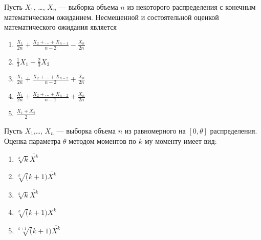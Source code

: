 \documentclass[t]{beamer}
\begin{document}
 \begin{frame} \label{33} 
\begin{block}{33} 

Пусть $X_1$, \ldots, $X_n$ — выборка объема $n$ из некоторого распределения с конечным математическим ожиданием. Несмещенной и состоятельной оценкой математического ожидания является
 


 \end{block} 
\begin{enumerate} 
\item[] \hyperlink{33-Yes}{\beamergotobutton{} $\frac{X_1}{2n}+\frac{X_2+\ldots+X_{n-1}}{n-2}-\frac{X_n}{2 n}$}
\item[] \hyperlink{33-No}{\beamergotobutton{} $\frac{1}{3} X_1 + \frac{2}{3} X_2$}
\item[] \hyperlink{33-No}{\beamergotobutton{} $\frac{X_1}{2 n}+\frac{X_2+\ldots+X_{n-2}}{n-2}+\frac{X_n}{2 n}$}
\item[] \hyperlink{33-No}{\beamergotobutton{} $\frac{X_1}{2 n}+\frac{X_2+\ldots+X_{n-2}}{n-1}+\frac{X_n}{2 n}$}
\item[] \hyperlink{33-No}{\beamergotobutton{} $\frac{X_1+X_2}{2}$}
\end{enumerate} 
\end{frame} 


 \begin{frame} \label{34} 
\begin{block}{34} 

Пусть $X_1$,\ldots, $X_n$ — выборка объема $n$ из равномерного на $[0, \theta]$ распределения. Оценка параметра $\theta$ методом моментов по $k$-му моменту имеет вид:
 


 \end{block} 
\begin{enumerate} 
\item[] \hyperlink{34-No}{\beamergotobutton{} $\sqrt[k]k \overline{X^k}$}
\item[] \hyperlink{34-No}{\beamergotobutton{} $\sqrt[k](k+1) \overline{X^k}$}
\item[] \hyperlink{34-No}{\beamergotobutton{} $\sqrt[k]k \overline{X^k}$}
\item[] \hyperlink{34-Yes}{\beamergotobutton{} $\sqrt[k](k+1) \overline{X^k}$}
\item[] \hyperlink{34-No}{\beamergotobutton{} $\sqrt[k+1](k+1) \overline{X^k}$}
\end{enumerate} 
\end{frame} 
\end{document}
